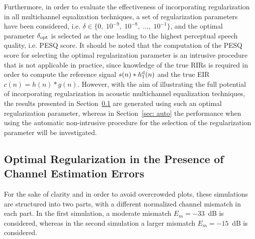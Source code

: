 \documentclass[10pt]{IEEEtran}
\begin{document}
Furthermore, in order to evaluate the effectiveness of incorporating regularization in all multichannel equalization techniques, a set of regularization parameters have been considered, i.e. $\delta \in \{0, \; 10^{-9}, \; 10^{-8}, \; \ldots, \; 10^{-1} \}$, and the optimal parameter $\delta_{\rm opt}$ is selected as the one leading to the highest perceptual speech quality, i.e. PESQ score.
It should be noted that the computation of the PESQ score for selecting the optimal regularization parameter is an intrusive procedure that is not applicable in practice, since knowledge of the true RIRs is required in order to compute the reference signal $s(n) \ast h_1^{\rm d}(n)$ and the true EIR $c(n) = h(n) \ast g(n)$.
However, with the aim of illustrating the full potential of incorporating regularization in acoustic multichannel equalization techniques, the results presented in Section~\ref{sec: regacsys} are generated using such an optimal regularization parameter, whereas in Section~\ref{sec: auto} the performance when using the automatic non-intrusive procedure for the selection of the regularization parameter will be investigated.

\subsection{Optimal Regularization in the Presence of Channel Estimation Errors}
\label{sec: regacsys}
For the sake of clarity and in order to avoid overcrowded plots, these simulations are structured into two parts, with a different normalized channel mismatch in each part.
In the first simulation, a moderate mismatch $E_m = -33$~dB is considered, whereas in the second simulation a larger mismatch $E_m = -15$~dB is considered.
\end{document}
